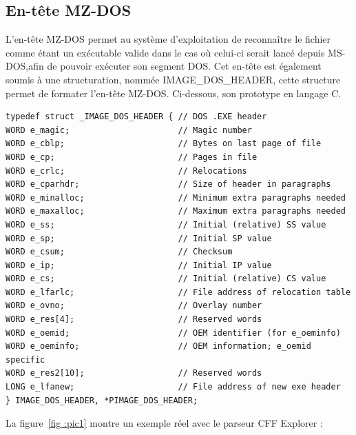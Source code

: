 \subsection{En-tête MZ-DOS}
L'en-tête MZ-DOS permet au système d'exploitation de reconnaître le fichier comme étant un exécutable valide dans le cas où celui-ci serait lancé depuis MS-DOS,afin de pouvoir exécuter son segment DOS. Cet en-tête est également soumis à une structuration, nommée IMAGE\_DOS\_HEADER, cette structure permet de formater l'en-tête MZ-DOS. Ci-dessous, son prototype en langage C.
\begin{lstlisting}
typedef struct _IMAGE_DOS_HEADER { // DOS .EXE header
WORD e_magic;                      // Magic number
WORD e_cblp;                       // Bytes on last page of file
WORD e_cp;                         // Pages in file
WORD e_crlc;                       // Relocations
WORD e_cparhdr;                    // Size of header in paragraphs
WORD e_minalloc;                   // Minimum extra paragraphs needed
WORD e_maxalloc;                   // Maximum extra paragraphs needed
WORD e_ss;                         // Initial (relative) SS value
WORD e_sp;                         // Initial SP value
WORD e_csum;                       // Checksum
WORD e_ip;                         // Initial IP value
WORD e_cs;                         // Initial (relative) CS value
WORD e_lfarlc;                     // File address of relocation table
WORD e_ovno;                       // Overlay number
WORD e_res[4];                     // Reserved words 
WORD e_oemid;                      // OEM identifier (for e_oeminfo)
WORD e_oeminfo;                    // OEM information; e_oemid specific
WORD e_res2[10];                   // Reserved words
LONG e_lfanew;                     // File address of new exe header
} IMAGE_DOS_HEADER, *PIMAGE_DOS_HEADER;
\end{lstlisting}
\newpage
La figure~\ref{fig :pic1} montre un exemple réel avec le parseur CFF Explorer :
